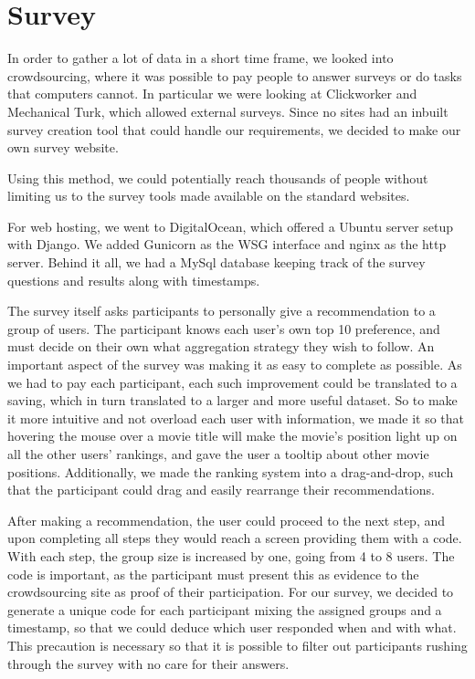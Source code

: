 \section{Survey}

In order to gather a lot of data in a short time frame, we looked into crowdsourcing, where it was possible to pay people to answer surveys or do tasks that computers cannot. In particular we were looking at Clickworker and Mechanical Turk, which allowed external surveys. Since no sites had an inbuilt survey creation tool that could handle our requirements, we decided to make our own survey website.

Using this method, we could potentially reach thousands of people without limiting us to the survey tools made available on the standard websites.

For web hosting, we went to DigitalOcean, which offered a Ubuntu server setup with Django. We added Gunicorn as the WSG interface and nginx as the http server. Behind it all, we had a MySql database keeping track of the survey questions and results along with timestamps.


The survey itself asks participants to personally give a recommendation to a group of users. The participant knows each user's own top 10 preference, and must decide on their own what aggregation strategy they wish to follow. An important aspect of the survey was making it as easy to complete as possible. As we had to pay each participant, each such improvement could be translated to a saving, which in turn translated to a larger and more useful dataset. So to make it more intuitive and not overload each user with information, we made it so that hovering the mouse over a movie title will make the movie's position light up on all the other users' rankings, and gave the user a tooltip about other movie positions. Additionally, we made the ranking system into a drag-and-drop, such that the participant could drag and easily rearrange their recommendations.

After making a recommendation, the user could proceed to the next step, and upon completing all steps they would reach a screen providing them with a code. With each step, the group size is increased by one, going from 4 to 8 users. The code is important, as the participant must present this as evidence to the crowdsourcing site as proof of their participation. For our survey, we decided to generate a unique code for each participant mixing the assigned groups and a timestamp, so that we could deduce which user responded when and with what. This precaution is necessary so that it is possible to filter out participants rushing through the survey with no care for their answers.

